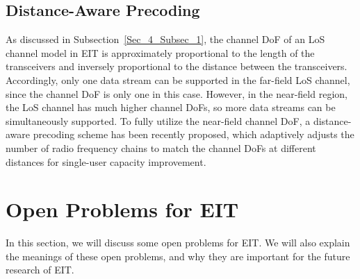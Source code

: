 \documentclass[journal,twocolumn]{IEEEtran}
\begin{document}

\vspace{-1mm}
\subsection{Distance-Aware Precoding}
As discussed in Subsection~\ref{Sec_4_Subsec_1}, the channel DoF of an LoS channel model in EIT is approximately proportional to the length of the transceivers and inversely proportional to the distance between the transceivers. 
Accordingly, only one data stream can be supported in the far-field LoS channel, since the channel DoF is only one in this case. 
However, in the near-field region, the LoS channel has much higher channel DoFs, so more data streams can be simultaneously supported.
To fully utilize the near-field channel DoF, a distance-aware precoding scheme has been recently proposed, which adaptively adjusts the number of radio frequency chains to match the channel DoFs at different distances for single-user capacity improvement.   



\section{Open Problems for EIT}
In this section, we will discuss some open problems for EIT. We will also explain the meanings of these open problems, and why they are important for the future research of EIT. 
\end{document}
